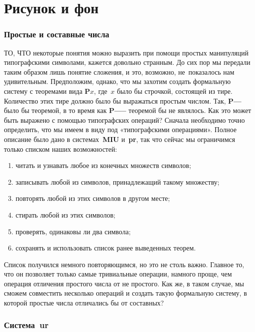 \documentclass[../main.tex]{subfiles}
\begin{document}
\chapter{Рисунок и фон}

\subsection{Простые и составные числа}

ТО, ЧТО некоторые понятия можно выразить при помощи простых манипуляций типографскими символами, кажется довольно странным. До сих пор мы передали таким образом лишь понятие сложения, и это, возможно, не~показалось нам удивительным. Предположим, однако, что мы захотим создать формальную систему с теоремами вида \textbf{P$x$}, где~$x$ было бы строчкой, состоящей из тире. Количество этих тире должно было бы выражаться простым числом. Так, \textbf{P--{}--} было бы теоремой, в то время как \textbf{P--{}--{}--} теоремой бы не являлось. Как это может быть выражено с помощью типографских операций? Сначала необходимо точно определить, что мы имеем в виду под «типографскими операциями». Полное описание было дано в системах~\textbf{MIU} и~\textbf{pr}, так что сейчас мы ограничимся только списком наших возможностей:

\begin{enumerate}[label=(\arabic*), noitemsep, topsep=6pt]
    \item читать и узнавать любое из конечных множеств символов;
    \item записывать любой из символов, принадлежащий такому множеству;
    \item повторять любой из этих символов в другом месте;
    \item стирать любой из этих символов;
    \item проверять, одинаковы ли два символа;
    \item сохранять и использовать список ранее выведенных теорем.
\end{enumerate}

Список получился немного повторяющимся, но это не столь важно. Главное то, что он позволяет только самые тривиальные операции, намного проще, чем операция отличения простого числа от не простого. Как же, в таком случае, мы сможем совместить несколько операций и создать такую формальную систему, в которой простые числа отличались бы от составных?

\subsection{Система~\textbf{ur}}
\end{document}
